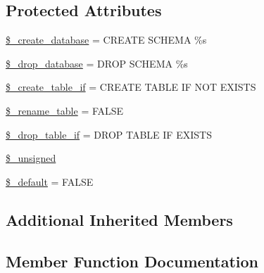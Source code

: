 \subsection*{Protected Attributes}
\begin{DoxyCompactItemize}
\item 
\hyperlink{class_c_i___d_b__pdo__4d__forge_acd23c9a8735806155f1a5d0a87c151f2}{\$\+\_\+create\+\_\+database} = \textquotesingle{}C\+R\+E\+A\+T\+E S\+C\+H\+E\+M\+A \%s\textquotesingle{}
\item 
\hyperlink{class_c_i___d_b__pdo__4d__forge_a8305b12fc17f6f87778260ebdff287b4}{\$\+\_\+drop\+\_\+database} = \textquotesingle{}D\+R\+O\+P S\+C\+H\+E\+M\+A \%s\textquotesingle{}
\item 
\hyperlink{class_c_i___d_b__pdo__4d__forge_a2f6484fcb8d1dc3eef67a637227cd583}{\$\+\_\+create\+\_\+table\+\_\+if} = \textquotesingle{}C\+R\+E\+A\+T\+E T\+A\+B\+L\+E I\+F N\+O\+T E\+X\+I\+S\+T\+S\textquotesingle{}
\item 
\hyperlink{class_c_i___d_b__pdo__4d__forge_a1a649e7cf9de16bcf932977b18bc91de}{\$\+\_\+rename\+\_\+table} = F\+A\+L\+S\+E
\item 
\hyperlink{class_c_i___d_b__pdo__4d__forge_a92a8a9145a7fc91e252e58d019373581}{\$\+\_\+drop\+\_\+table\+\_\+if} = \textquotesingle{}D\+R\+O\+P T\+A\+B\+L\+E I\+F E\+X\+I\+S\+T\+S\textquotesingle{}
\item 
\hyperlink{class_c_i___d_b__pdo__4d__forge_aae977ae6d61fa183f0b25422b6ddc31c}{\$\+\_\+unsigned}
\item 
\hyperlink{class_c_i___d_b__pdo__4d__forge_aa119e1b4e3d00f47a7b83b7066087915}{\$\+\_\+default} = F\+A\+L\+S\+E
\end{DoxyCompactItemize}
\subsection*{Additional Inherited Members}


\subsection{Member Function Documentation}
\hypertarget{class_c_i___d_b__pdo__4d__forge_a41c6cae02f2fda8b429ad0afb9509426}{}
